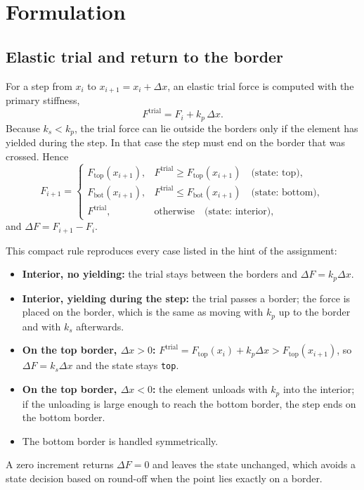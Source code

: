 \documentclass[11pt,a4paper]{article}
\begin{document}
\section{Formulation}
\subsection{Elastic trial and return to the border}
For a step from $x_i$ to $x_{i+1} = x_i + \Delta x$, an elastic trial force is computed with the
primary stiffness,
\begin{equation}
  F^{\text{trial}} = F_i + k_p\,\Delta x .
\end{equation}
Because $k_s < k_p$, the trial force can lie outside the borders only if the element has yielded
during the step. In that case the step must end on the border that was crossed. Hence
\begin{equation}
  F_{i+1} =
  \begin{cases}
    F_{\text{top}}(x_{i+1}), & F^{\text{trial}} \ge F_{\text{top}}(x_{i+1}) \quad\text{(state: top)},\\[2pt]
    F_{\text{bot}}(x_{i+1}), & F^{\text{trial}} \le F_{\text{bot}}(x_{i+1}) \quad\text{(state: bottom)},\\[2pt]
    F^{\text{trial}},        & \text{otherwise} \quad\text{(state: interior)},
  \end{cases}
  \label{eq:update}
\end{equation}
and $\Delta F = F_{i+1} - F_i$.

This compact rule reproduces every case listed in the hint of the assignment:
\begin{itemize}
  \item \textbf{Interior, no yielding:} the trial stays between the borders and $\Delta F = k_p\Delta x$.
  \item \textbf{Interior, yielding during the step:} the trial passes a border; the force is placed
        on the border, which is the same as moving with $k_p$ up to the border and with $k_s$ afterwards.
  \item \textbf{On the top border, $\Delta x > 0$:} $F^{\text{trial}} = F_{\text{top}}(x_i) + k_p\Delta x
        > F_{\text{top}}(x_{i+1})$, so $\Delta F = k_s\Delta x$ and the state stays \texttt{top}.
  \item \textbf{On the top border, $\Delta x < 0$:} the element unloads with $k_p$ into the interior;
        if the unloading is large enough to reach the bottom border, the step ends on the bottom border.
  \item The bottom border is handled symmetrically.
\end{itemize}
A zero increment returns $\Delta F = 0$ and leaves the state unchanged, which avoids a state
decision based on round-off when the point lies exactly on a border.
\end{document}
